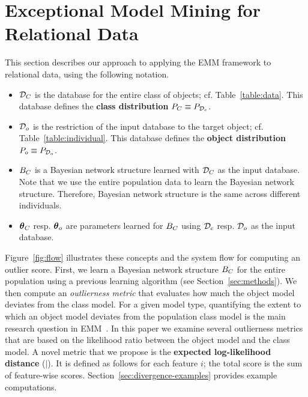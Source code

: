 {\section{Exceptional Model Mining for Relational Data} \label{sec:eld}

This section describes our approach to applying the EMM framework to relational data, using the following notation.
%
\begin{itemize}
	\item $\mathcal{D}_{C}$ is the database for the entire class of objects; cf. Table~\ref{table:data}. This database defines the \textbf{class distribution} $P_{C} \equiv P_{\mathcal{D}_{c}}$.
	\item $\mathcal{D}_{o}$ is the restriction of the input database to the target object; cf. Table~\ref{table:individual}. This database defines the \textbf{object distribution} $P_{o} \equiv P_{\mathcal{D}_{o}}$.
	\item $B_{C}$ is a Bayesian network structure learned with $\mathcal{D}_{C}$ as the input database. Note that we use the entire population data to learn the Bayesian network structure. Therefore, Bayesian network structure is the same across different individuals.
	\item $\boldsymbol{\theta}_{C}$ resp. $\boldsymbol{\theta}_{o}$ are parameters learned for $B_{C}$ using $\mathcal{D}_{c}$ resp. $\mathcal{D}_{o}$ as the input database.
\end{itemize}

Figure~\ref{fig:flow} illustrates these concepts and the system flow for computing an outlier score. First, we learn a Bayesian network structure $B_{C}$ for the entire population using a previous learning algorithm (see Section~\ref{sec:methods}). We then compute an {\em outlierness metric} that evaluates how much the object model deviates from the class model. 
%
%
For a given model type, quantifying the extent to which an object model deviates from the population class model is the main research question in EMM~\citep{Duivesteijn2016}. In this paper we examine several outlierness metrics that are based on the likelihood ratio between the object model and the class model. 
A novel metric that we propose is the \textbf{expected log-likelihood distance} ($\mid$). It is defined as follows for each feature $i$; the total score is the sum of feature-wise scores. Section~\ref{sec:divergence-examples}  provides example computations.


}
